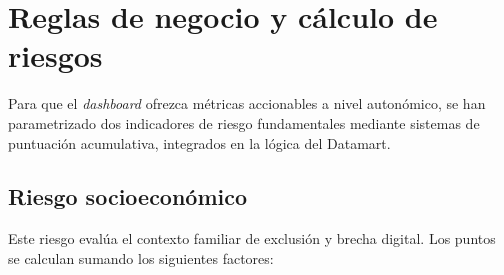 \section{Reglas de negocio y cálculo de riesgos}

Para que el \textit{dashboard} ofrezca métricas accionables a nivel autonómico, se han parametrizado dos indicadores de riesgo fundamentales mediante sistemas de puntuación acumulativa, integrados en la lógica del Datamart.

\subsection{Riesgo socioeconómico}
Este riesgo evalúa el contexto familiar de exclusión y brecha digital. Los puntos se calculan sumando los siguientes factores:

